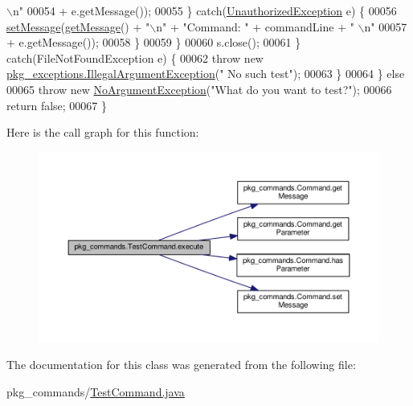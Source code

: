 \begin{DoxyCode}
{      \(\backslash\)n"}
00054                                 + e.getMessage());
00055                     \} \textcolor{keywordflow}{catch}(\hyperlink{classpkg__exceptions_1_1UnauthorizedException}{UnauthorizedException} e)  \{
00056                         \hyperlink{classpkg__commands_1_1Command_ae210ff216fe908b111ba1c988a963d13}{setMessage}(\hyperlink{classpkg__commands_1_1Command_ac2a42e2bab264821892daefaf9a18b6c}{getMessage}() + \textcolor{stringliteral}{"\(\backslash\)n"} + \textcolor{stringliteral}{"Command: "} + commandLine + \textcolor{stringliteral}{"
      \(\backslash\)n"}
00057                                 + e.getMessage());
00058                     \}
00059                 \}
00060                 s.close();
00061             \} \textcolor{keywordflow}{catch}(FileNotFoundException e) \{
00062                 \textcolor{keywordflow}{throw} \textcolor{keyword}{new} \hyperlink{classpkg__exceptions_1_1IllegalArgumentException}{pkg\_exceptions.IllegalArgumentException}(\textcolor{stringliteral}{"
      No such test"});
00063             \}
00064         \} \textcolor{keywordflow}{else}
00065             \textcolor{keywordflow}{throw} \textcolor{keyword}{new} \hyperlink{classpkg__exceptions_1_1NoArgumentException}{NoArgumentException}(\textcolor{stringliteral}{"What do you want to test?"});
00066         \textcolor{keywordflow}{return} \textcolor{keyword}{false};
00067     \}
\end{DoxyCode}


Here is the call graph for this function\-:
\nopagebreak
\begin{figure}[H]
\begin{center}
\leavevmode
\includegraphics[width=350pt]{classpkg__commands_1_1TestCommand_a1ff07c27a46910d20c2e4569888892ca_cgraph}
\end{center}
\end{figure}




The documentation for this class was generated from the following file\-:\begin{DoxyCompactItemize}
\item 
pkg\-\_\-commands/\hyperlink{TestCommand_8java}{Test\-Command.\-java}\end{DoxyCompactItemize}
